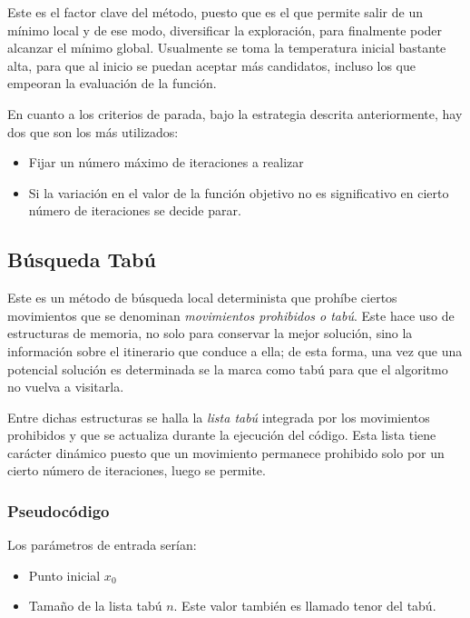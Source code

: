\documentclass[titlepage, 11pt]{scrartcl}
\begin{document}
			Este es el factor clave del método, puesto que es el que permite salir de un mínimo local y de ese modo, diversificar la exploración, para finalmente poder alcanzar el mínimo global. Usualmente se toma la temperatura inicial bastante alta, para que al inicio se puedan aceptar más candidatos, incluso los que empeoran la evaluación de la función.
			
			En cuanto a los criterios de parada, bajo la estrategia descrita anteriormente, hay dos que son los más utilizados:
			\begin{itemize}
				\item Fijar un número máximo de iteraciones a realizar
				\item Si la variación en el valor de la función objetivo no es significativo en cierto número de iteraciones se decide parar.
			\end{itemize}
	    

	    \subsection{Búsqueda Tabú}
			Este es un método de búsqueda local determinista que prohíbe ciertos movimientos que se denominan \textit{movimientos prohibidos o tabú}. Este hace uso de estructuras de memoria, no solo para conservar la mejor solución, sino la información sobre el itinerario que conduce a ella; de esta forma, una vez que una potencial solución es determinada se la marca como tabú para que el algoritmo no vuelva a visitarla.
			
			Entre dichas estructuras se halla la \textit{lista tabú} integrada por los movimientos prohibidos y que se actualiza durante la ejecución del código. Esta lista tiene carácter dinámico puesto que un movimiento permanece prohibido solo por un cierto número de iteraciones, luego se permite.
			
			\subsubsection{Pseudocódigo}
			Los parámetros de entrada serían:
			\begin{itemize}
				\item Punto inicial $x_0$
				\item Tamaño de la lista tabú $n$. Este valor también es llamado tenor del tabú.
			\end{itemize}
			
\end{document}
